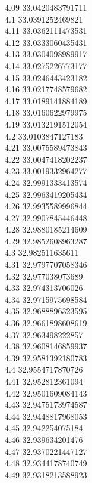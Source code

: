 {4.09	33.0420483791711\\
4.1	33.0391252469821\\
4.11	33.0362111473531\\
4.12	33.0333060435431\\
4.13	33.0304098989917\\
4.14	33.0275226773177\\
4.15	33.0246443423182\\
4.16	33.0217748579682\\
4.17	33.0189141884189\\
4.18	33.0160622979975\\
4.19	33.0132191512054\\
4.2	33.0103847127183\\
4.21	33.0075589473843\\
4.22	33.0047418202237\\
4.23	33.0019332964277\\
4.24	32.9991333413574\\
4.25	32.9963419205434\\
4.26	32.9935589996844\\
4.27	32.9907845446448\\
4.28	32.9880185214609\\
4.29	32.9852608963287\\
4.3	32.982511635611\\
4.31	32.9797707058346\\
4.32	32.977038073689\\
4.33	32.974313706026\\
4.34	32.9715975698584\\
4.35	32.9688896323595\\
4.36	32.9661898608619\\
4.37	32.963498222857\\
4.38	32.9608146859937\\
4.39	32.9581392180783\\
4.4	32.9554717870726\\
4.41	32.952812361094\\
4.42	32.9501609084143\\
4.43	32.9475173974587\\
4.44	32.9448817968053\\
4.45	32.942254075184\\
4.46	32.939634201476\\
4.47	32.9370221447127\\
4.48	32.9344178740749\\
4.49	32.9318213588923\\
}
